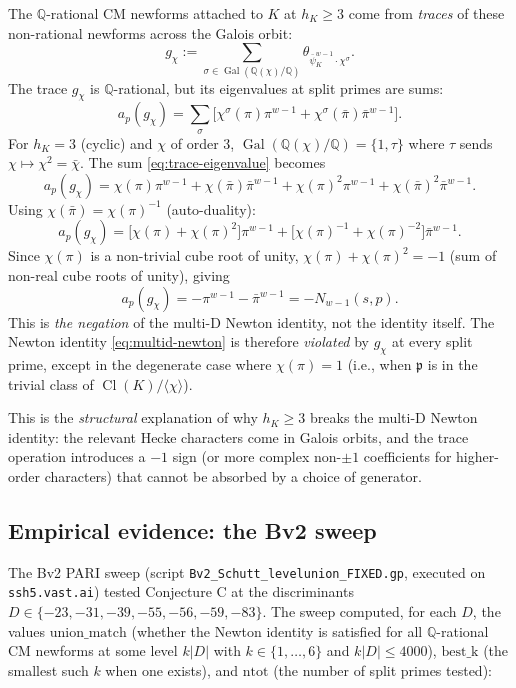 \documentclass[11pt,a4paper]{amsart}
\theoremstyle{definition}
\DeclareMathOperator{\Gal}{Gal}
\DeclareMathOperator{\Cl}{Cl}
\newcommand{\Q}{\mathbb{Q}}
\newcommand{\fp}{\mathfrak{p}}
\newcommand{\hK}{h_{K}}
\begin{document}
The $\Q$-rational CM newforms attached to $K$ at $\hK \ge 3$ come from \emph{traces} of these non-rational newforms across the Galois orbit:
\begin{equation}\label{eq:trace-newform}
g_\chi := \sum_{\sigma \in \Gal(\Q(\chi)/\Q)} \theta_{\bar\psi_K^{w-1} \cdot \chi^\sigma}.
\end{equation}
The trace $g_\chi$ is $\Q$-rational, but its eigenvalues at split primes are sums:
\begin{equation}\label{eq:trace-eigenvalue}
a_p(g_\chi) = \sum_{\sigma} \bigl[\chi^\sigma(\pi) \pi^{w-1} + \chi^\sigma(\bar\pi) \bar\pi^{w-1}\bigr].
\end{equation}
For $\hK = 3$ (cyclic) and $\chi$ of order $3$, $\Gal(\Q(\chi)/\Q) = \{1, \tau\}$ where $\tau$ sends $\chi \mapsto \chi^2 = \bar\chi$. The sum \eqref{eq:trace-eigenvalue} becomes
\[
a_p(g_\chi) = \chi(\pi) \pi^{w-1} + \chi(\bar\pi) \bar\pi^{w-1} + \chi(\pi)^2 \pi^{w-1} + \chi(\bar\pi)^2 \bar\pi^{w-1}.
\]
Using $\chi(\bar\pi) = \chi(\pi)^{-1}$ (auto-duality):
\[
a_p(g_\chi) = \bigl[\chi(\pi) + \chi(\pi)^2\bigr] \pi^{w-1} + \bigl[\chi(\pi)^{-1} + \chi(\pi)^{-2}\bigr] \bar\pi^{w-1}.
\]
Since $\chi(\pi)$ is a non-trivial cube root of unity, $\chi(\pi) + \chi(\pi)^2 = -1$ (sum of non-real cube roots of unity), giving
\begin{equation}\label{eq:trace-collapse-hK3}
a_p(g_\chi) = -\pi^{w-1} - \bar\pi^{w-1} = -N_{w-1}(s, p).
\end{equation}
This is \emph{the negation} of the multi-D Newton identity, not the identity itself. The Newton identity \eqref{eq:multid-newton} is therefore \emph{violated} by $g_\chi$ at every split prime, except in the degenerate case where $\chi(\pi) = 1$ (i.e., when $\fp$ is in the trivial class of $\Cl(K)/\langle \chi \rangle$).

This is the \emph{structural} explanation of why $\hK \ge 3$ breaks the multi-D Newton identity: the relevant Hecke characters come in Galois orbits, and the trace operation introduces a $-1$ sign (or more complex non-$\pm 1$ coefficients for higher-order characters) that cannot be absorbed by a choice of generator.

\subsection{Empirical evidence: the Bv2 sweep}\label{sec:conjC-Bv2}

The Bv2 PARI sweep (script \texttt{Bv2\_Schutt\_levelunion\_FIXED.gp}, executed on \texttt{ssh5.vast.ai}) tested Conjecture C at the discriminants $D \in \{-23, -31, -39, -55, -56, -59, -83\}$. The sweep computed, for each $D$, the values $\mathrm{union\_match}$ (whether the Newton identity is satisfied for all $\Q$-rational CM newforms at some level $k|D|$ with $k \in \{1, \ldots, 6\}$ and $k|D| \le 4000$), $\mathrm{best\_k}$ (the smallest such $k$ when one exists), and $\mathrm{ntot}$ (the number of split primes tested):
\end{document}
